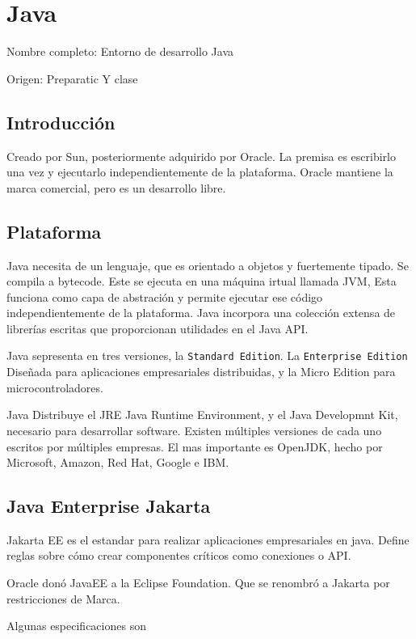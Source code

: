 \setcounter{section}{67}
\section{Java}

Nombre completo: Entorno de desarrollo Java

Origen: Preparatic Y clase

\localtableofcontents

\subsection{Introducción}
    Creado por Sun, posteriormente adquirido por Oracle. La premisa es escribirlo una vez y ejecutarlo independientemente de la plataforma. Oracle mantiene la marca comercial, pero es un desarrollo libre.

\subsection{Plataforma}
    Java necesita de un lenguaje, que es orientado a objetos y fuertemente tipado. Se compila a bytecode. Este se ejecuta en una máquina irtual llamada JVM, Esta funciona como capa de abstración y permite ejecutar ese código independientemente de la plataforma. Java incorpora una colección extensa de librerías escritas que proporcionan utilidades en el Java API.

    Java sepresenta en tres versiones, la \texttt{Standard Edition}. La \texttt{Enterprise Edition} Diseñada para aplicaciones empresariales distribuidas, y la Micro Edition para microcontroladores.

    Java Distribuye el JRE Java Runtime Environment, y el Java Developmnt Kit, necesario para desarrollar software. Existen múltiples versiones de cada uno escritos por múltiples empresas. El mas importante es OpenJDK, hecho por Microsoft, Amazon, Red Hat, Google e IBM.

\subsection{Java Enterprise Jakarta}
    Jakarta EE es el estandar para realizar aplicaciones empresariales en java. Define reglas sobre cómo crear componentes críticos como conexiones o API.

    Oracle donó JavaEE a la Eclipse Foundation. Que se renombró a Jakarta por restricciones de Marca.

    Algunas especificaciones son

